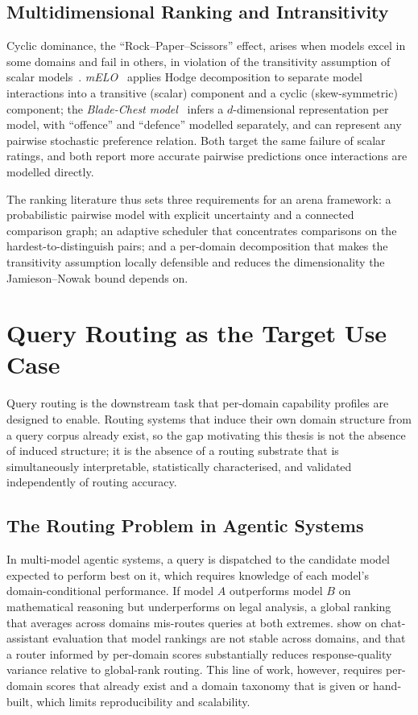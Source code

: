 \subsection*{Multidimensional Ranking and Intransitivity}

Cyclic dominance, the ``Rock--Paper--Scissors'' effect, arises when
models excel in some domains and fail in others, in violation of the
transitivity assumption of scalar
models~\parencite{balduzzi2018melo}.
\textit{mELO}~\parencite{balduzzi2018melo} applies Hodge
decomposition to separate model interactions into a transitive
(scalar) component and a cyclic (skew-symmetric) component; the
\textit{Blade-Chest model}~\parencite{chen2016bladechest} infers a
$d$-dimensional representation per model, with ``offence'' and
``defence'' modelled separately, and can represent any pairwise
stochastic preference relation. Both target the same failure of
scalar ratings, and both report more accurate pairwise predictions
once interactions are modelled directly.

\bigskip
\noindent
The ranking literature thus sets three requirements for an arena
framework: a probabilistic pairwise model with explicit uncertainty
and a connected comparison graph; an adaptive scheduler that
concentrates comparisons on the hardest-to-distinguish pairs; and a
per-domain decomposition that makes the transitivity assumption
locally defensible and reduces the dimensionality the
Jamieson--Nowak bound depends on.


\section{Query Routing as the Target Use Case}\label{sec:routing}

Query routing is the downstream task that per-domain capability
profiles are designed to enable. Routing systems that induce their
own domain structure from a query corpus already exist, so the gap
motivating this thesis is not the absence of induced structure; it is
the absence of a routing substrate that is simultaneously
interpretable, statistically characterised, and validated
independently of routing accuracy.

\subsection*{The Routing Problem in Agentic Systems}

In multi-model agentic systems, a query is dispatched to the
candidate model expected to perform best on it, which requires
knowledge of each model's domain-conditional performance. If model
$A$ outperforms model $B$ on mathematical reasoning but underperforms
on legal analysis, a global ranking that averages across domains
mis-routes queries at both extremes.
\textcite{raju2024constructing} show on chat-assistant evaluation
that model rankings are not stable across domains, and that a router
informed by per-domain scores substantially reduces response-quality
variance relative to global-rank routing. This line of work, however,
requires per-domain scores that already exist and a domain taxonomy
that is given or hand-built, which limits reproducibility and
scalability.


